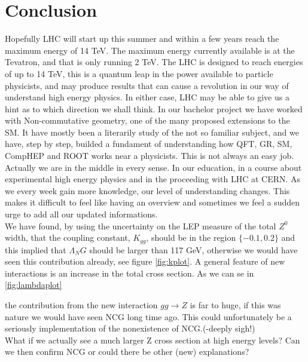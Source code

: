 \section{Conclusion}
Hopefully LHC will start up this summer and within a few years reach the maximum energy of 14 TeV. The maximum energy currently available is at the Tevatron, and that is only running 2 TeV. The LHC is designed to reach energies of up to 14 TeV, this is a quantum leap in the power available to particle physicists, and may produce results that can cause a revolution in our way of understand high energy physics. In either case, LHC may be able to give us a hint as to which direction we shall think. In our bachelor project we have worked with Non-commutative geometry, one of the many proposed extensions to the SM. It have mostly been a literarily study of the not so familiar subject, and we have, step by step, builded a fundament of understanding how QFT, GR, SM, CompHEP and ROOT works near a physicists. This is not always an easy job. Actually we are in the middle in every sense. In our education, in a course about experimental high energy physics and in the proceeding with LHC at CERN. As we every week gain more knowledge, our level of understanding changes. This makes it difficult to feel like having an overview and sometimes we feel a sudden urge to add all our updated informations.\\


We have found, by using the uncertainty on the LEP measure of the total $Z^0$ width, that the coupling constant, $K_{gg}$, should be in the region $\{-0.1,0.2\}$ and this implied that $\Lambda_NG$ should be larger than 117 GeV, otherwise we would have seen this contribution already, see figure \ref{fig:kplot}. A general feature of new interactions is an increase in the total cross section. As we can se in \ref{fig:lambdaplot}


the contribution from the new interaction $gg \rightarrow Z$ is far to huge, if this was nature we would have seen NCG long time ago. This could unfortunately be a seriously implementation of the nonexistence of NCG.(-deeply sigh!)\\

What if we actually see a much larger Z cross section at high energy levels? Can we then confirm NCG or could there be other (new) explanations?
